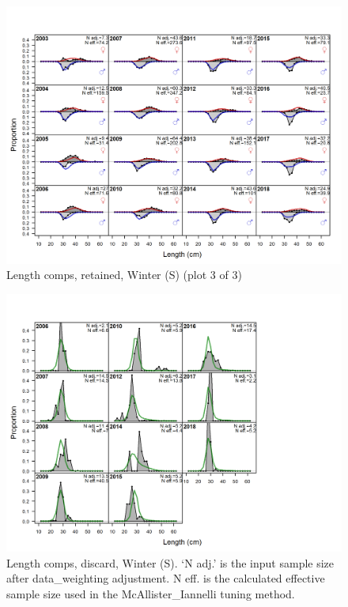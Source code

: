 \documentclass[12pt,]{article}
\begin{document}
\begin{figure}
\centering
\includegraphics{r4ss/plots_mod1/comp_lenfit_flt3mkt2_page3.png}
\caption{Length comps, retained, Winter (S) (plot 3 of 3)
\label{fig:length_fits}}
\end{figure}

\begin{figure}
\centering
\includegraphics{r4ss/plots_mod1/comp_lenfit_flt3mkt1.png}
\caption{Length comps, discard, Winter (S). `N adj.' is the input sample
size after data\_weighting adjustment. N eff. is the calculated
effective sample size used in the McAllister\_Iannelli tuning method.
\label{fig:length_fits}}
\end{figure}
\end{document}
